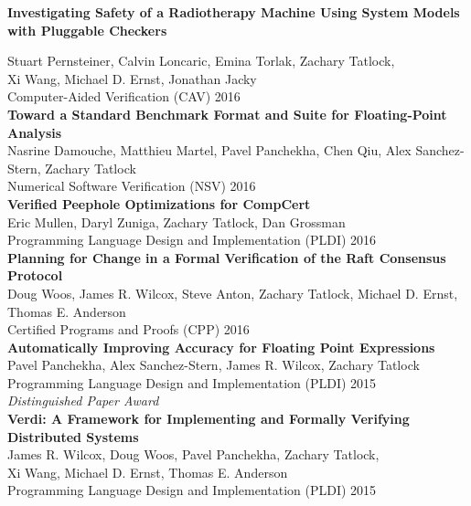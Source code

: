 \documentclass[10pt]{article}
\begin{document}
\begin{small}
\textbf{%
Investigating Safety of a Radiotherapy Machine Using System Models with Pluggable Checkers
} \\
\end{small}
Stuart Pernsteiner, Calvin Loncaric, Emina Torlak, Zachary Tatlock, \\
Xi Wang, Michael D. Ernst, Jonathan Jacky \\
Computer-Aided Verification (CAV) 2016 \\

\textbf{%
Toward a Standard Benchmark Format and Suite for Floating-Point Analysis
} \\
Nasrine Damouche, Matthieu Martel, Pavel Panchekha, Chen Qiu, Alex Sanchez-Stern, Zachary Tatlock \\
Numerical Software Verification (NSV) 2016 \\

\textbf{%
Verified Peephole Optimizations for CompCert
} \\
Eric Mullen, Daryl Zuniga, Zachary Tatlock, Dan Grossman \\
Programming Language Design and Implementation (PLDI) 2016 \\

\textbf{%
Planning for Change in a Formal Verification of the Raft Consensus Protocol
} \\
Doug Woos, James R. Wilcox, Steve Anton, Zachary Tatlock, Michael D. Ernst, Thomas E. Anderson \\
Certified Programs and Proofs (CPP) 2016 \\

\textbf{%
Automatically Improving Accuracy for Floating Point Expressions
} \\
Pavel Panchekha, Alex Sanchez-Stern, James R. Wilcox, Zachary Tatlock \\
Programming Language Design and Implementation (PLDI) 2015 \\
\textit{Distinguished Paper Award} \\

\textbf{%
Verdi: A Framework for Implementing and Formally Verifying Distributed Systems
} \\
James R. Wilcox, Doug Woos, Pavel Panchekha, Zachary Tatlock, \\
Xi Wang, Michael D. Ernst, Thomas E. Anderson \\
Programming Language Design and Implementation (PLDI) 2015 \\
\end{document}
